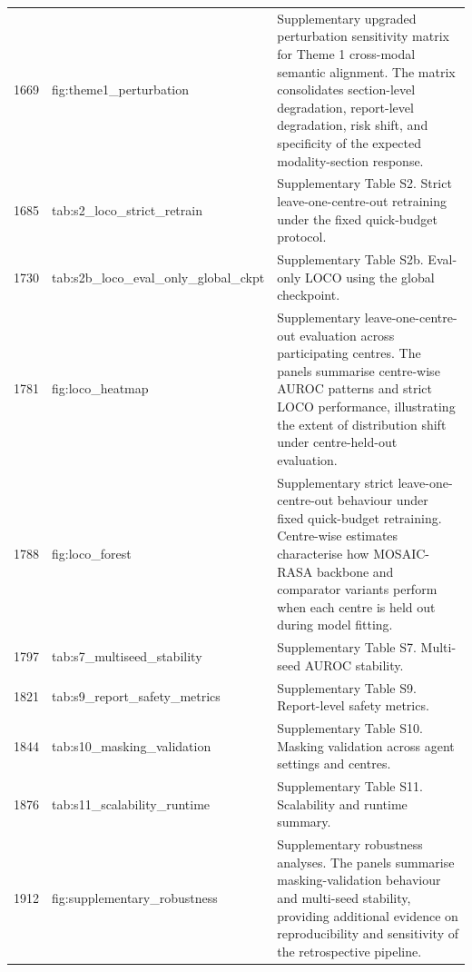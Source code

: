 \documentclass[11pt,a4paper]{article}
\begin{document}
\begin{small}
\begin{longtable}{p{1.7cm}p{4.2cm}p{9.0cm}}
1669 & fig:theme1\_perturbation & Supplementary upgraded perturbation sensitivity matrix for Theme 1 cross-modal semantic alignment. The matrix consolidates section-level degradation, report-level degradation, risk shift, and specificity of the expected modality-section response. \\
1685 & tab:s2\_loco\_strict\_retrain & Supplementary Table S2. Strict leave-one-centre-out retraining under the fixed quick-budget protocol. \\
1730 & tab:s2b\_loco\_eval\_only\_global\_ckpt & Supplementary Table S2b. Eval-only LOCO using the global checkpoint. \\
1781 & fig:loco\_heatmap & Supplementary leave-one-centre-out evaluation across participating centres. The panels summarise centre-wise AUROC patterns and strict LOCO performance, illustrating the extent of distribution shift under centre-held-out evaluation. \\
1788 & fig:loco\_forest & Supplementary strict leave-one-centre-out behaviour under fixed quick-budget retraining. Centre-wise estimates characterise how MOSAIC-RASA backbone and comparator variants perform when each centre is held out during model fitting. \\
1797 & tab:s7\_multiseed\_stability & Supplementary Table S7. Multi-seed AUROC stability. \\
1821 & tab:s9\_report\_safety\_metrics & Supplementary Table S9. Report-level safety metrics. \\
1844 & tab:s10\_masking\_validation & Supplementary Table S10. Masking validation across agent settings and centres. \\
1876 & tab:s11\_scalability\_runtime & Supplementary Table S11. Scalability and runtime summary. \\
1912 & fig:supplementary\_robustness & Supplementary robustness analyses. The panels summarise masking-validation behaviour and multi-seed stability, providing additional evidence on reproducibility and sensitivity of the retrospective pipeline. \\
\bottomrule
\end{longtable}
\end{small}
\end{document}
